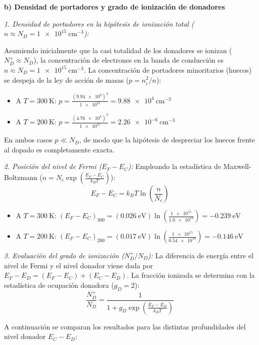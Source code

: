 \begin{problema}
\textbf{b) Densidad de portadores y grado de ionización de donadores}

\textit{1. Densidad de portadores en la hipótesis de ionización total ($n \approx N_D = \SI{1e15}{\cm^{-3}}$):}

Asumiendo inicialmente que la casi totalidad de los donadores se ionizan ($N_D^+ \approx N_D$), la concentración de electrones en la banda de conducción es $n \approx N_D = \SI{1e15}{\cm^{-3}}$. La concentración de portadores minoritarios (huecos) se despeja de la ley de acción de masas ($p = n_i^2 / n$):
\begin{itemize}
    \item A $T = \SI{300}{\kelvin}$: $p = \frac{(\num{9.94e9})^2}{\num{1e15}} = \SI{9.88e4}{\cm^{-3}}$
    \item A $T = \SI{200}{\kelvin}$: $p = \frac{(\num{4.76e4})^2}{\num{1e15}} = \SI{2.26e-6}{\cm^{-3}}$
\end{itemize}
En ambos casos $p \ll N_D$, de modo que la hipótesis de despreciar los huecos frente al dopado es completamente exacta.

\textit{2. Posición del nivel de Fermi ($E_F - E_C$):}
Empleando la estadística de Maxwell-Boltzmann ($n = N_c \exp\left(\frac{E_F - E_C}{k_B T}\right)$):
\[
E_F - E_C = k_B T \ln\left( \frac{n}{N_c} \right)
\]
\begin{itemize}
    \item A $T = \SI{300}{\kelvin}$: $(E_F - E_C)_{300} = (\SI{0.026}{\eV}) \ln\left( \frac{\num{1e15}}{\num{1.0e19}} \right) = \SI{-0.239}{\eV}$
    \item A $T = \SI{200}{\kelvin}$: $(E_F - E_C)_{200} = (\SI{0.017}{\eV}) \ln\left( \frac{\num{1e15}}{\num{0.54e19}} \right) = \SI{-0.146}{\eV}$
\end{itemize}

\textit{3. Evaluación del grado de ionización ($N_D^+ / N_D$):}
La diferencia de energía entre el nivel de Fermi y el nivel donador viene dada por $E_F - E_D = (E_F - E_C) + (E_C - E_D)$. La fracción ionizada se determina con la estadística de ocupación donadora ($g_D = 2$):
\[
\frac{N_D^+}{N_D} = \frac{1}{1 + g_D \exp\left( \frac{E_F - E_D}{k_B T} \right)}
\]

A continuación se comparan los resultados para las distintas profundidades del nivel donador $E_C - E_D$:


\end{problema}
